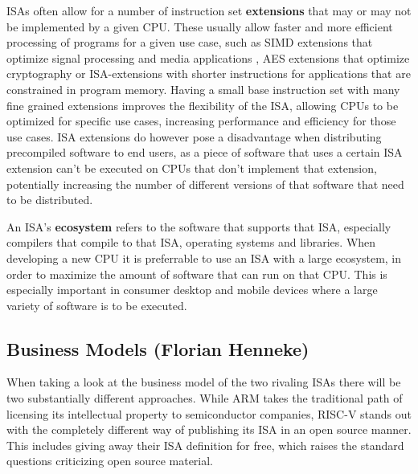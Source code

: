 \documentclass[conference]{IEEEtran}
\begin{document}
\glspl{ISA} often allow for a number of instruction set \textbf{extensions} that may or may not be implemented by a given \gls{CPU}. These usually allow
faster and more efficient processing of programs for a given use case, such as \gls{SIMD} extensions that optimize signal processing and media applications \cite[page 52]{Arm2020},
\gls{AES} extensions that optimize cryptography \cite{Arm2015} or \gls{ISA}-extensions with shorter instructions for applications that are constrained in program memory. \cite{Arm2005}
Having a small base instruction set with many fine grained extensions improves the flexibility of the \gls{ISA}, allowing \glspl{CPU} to be optimized for specific
use cases, increasing performance and efficiency for those use cases. \gls{ISA} extensions do however pose a disadvantage when distributing precompiled software
to end users, as a piece of software that uses a certain \gls{ISA} extension can't be executed on \glspl{CPU} that don't implement that extension, potentially
increasing the number of different versions of that software that need to be distributed.

An \gls{ISA}'s \textbf{ecosystem} refers to the software that supports that \gls{ISA}, especially compilers that compile to that \gls{ISA}, operating systems and libraries.
When developing a new \gls{CPU} it is preferrable to use an \gls{ISA} with a large ecosystem, in order to maximize the amount of software
that can run on that \gls{CPU}. This is especially important in consumer desktop and mobile devices where a large variety of software is to be executed.

	\subsection{Business Models (Florian Henneke)}
	\label{businessModels}
	When taking a look at the business model of the two rivaling \glspl{ISA} there will be two substantially different approaches. While ARM takes the traditional path of licensing its intellectual property to semiconductor companies, RISC-V stands out with the completely different way of publishing its \gls{ISA} in an open source manner. This includes giving away their \gls{ISA} definition for free, which raises the standard questions criticizing open source material. %
\end{document}
